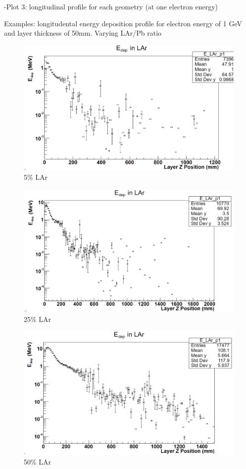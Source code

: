 \documentclass[%
 reprint,
 amsmath,amssymb,
 aps,
]{revtex4-2}
\begin{document}
-Plot 3: longitudinal profile for each geometry (at one electron energy)

Examples: longitudental energy deposition profile for electron energy of 1 GeV and layer thickness of 50mm. Varying LAr/Pb ratio

\begin{figure}[H]
    \centering
    \includegraphics[width=0.9\columnwidth]{profile_0.05_50_1000.png}%
    \caption{\label{fig:epsart} 5\% LAr}
\end{figure}

\begin{figure}[H]
    \centering
    \includegraphics[width=0.9\columnwidth]{profile_0.25_50_1000.png}%
    \caption{\label{fig:epsart} 25\% LAr }
\end{figure}

\begin{figure}[H]
    \centering
    \includegraphics[width=0.9\columnwidth]{profile_0.5_50_1000.png}%
    \caption{\label{fig:epsart} 50\% LAr }
\end{figure}
\end{document}

